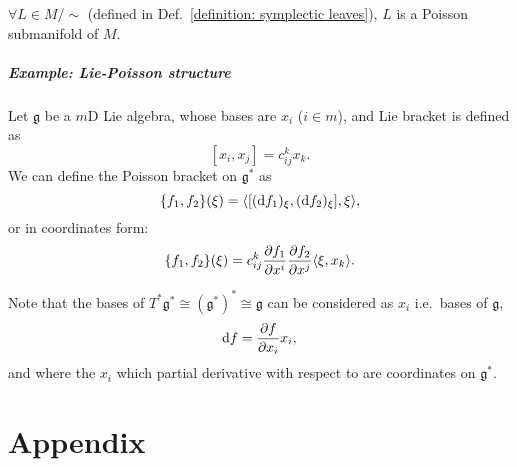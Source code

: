 \documentclass[openany, a5paper]{book}
\begin{document}
\begin{theorem} 
	$\forall L \in M / \sim$ (defined in Def.~\ref{definition: symplectic leaves}), $L$ is a Poisson submanifold of $M$.
\end{theorem}

\paragraph{Example: Lie-Poisson structure}
\begin{definition}
	Let $\mathfrak g$ be a $m$D Lie algebra, whose bases are $x_i$ ($i \in m$), and Lie bracket is defined as
	\begin{equation}\label{equation: Lie bracket}
		[x_i, x_j] = c^k_{ij} x_k.
	\end{equation}
	We can define the Poisson bracket on $\mathfrak g^*$ as
	\begin{equation}
		\{f_1,f_2\}(\xi) = \langle[(\mathrm{d} f_1)_\xi, (\mathrm{d} f_2)_\xi], \xi\rangle,
	\end{equation}
	or in coordinates form:
	\begin{equation}
		\{f_1, f_2\}(\xi) = c^k_{ij} \pdiff{f_1}{x^i} \pdiff{f_2}{x^j} \langle\xi, x_k\rangle.
	\end{equation}
\end{definition}

Note that the bases of $T^* \mathfrak g^* \cong (\mathfrak g^*)^* \cong \mathfrak g$ can be considered as $x_i$ i.e.\ bases of $\mathfrak g$,
\begin{equation}
	\dif f = \pdiff{f}{x_i} x_i,
\end{equation}
and where the $x_i$ which partial derivative with respect to are coordinates on $\mathfrak g^*$.


\appendix
\chapter{Appendix}

\backmatter
\nocite{*} %
\printbibliography[heading=bibliography, title={Bibliography}]

\printindex[symbol]

\printindex
\end{document}
